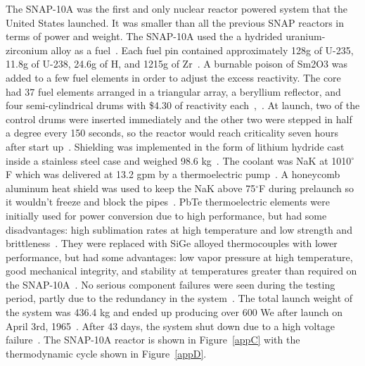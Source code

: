 \documentclass{article}
\begin{document}
The SNAP-10A was the first and only nuclear reactor powered system that the United States launched. It was smaller than all the previous SNAP reactors in terms of power and weight. The SNAP-10A used the a hydrided uranium-zirconium alloy as a fuel~\cite{lords1994snap}.  Each fuel pin contained approximately 128g of U-235, 11.8g of U-238, 24.6g of H, and 1215g of Zr~\cite{voss1984snap}. A burnable poison of Sm2O3 was added to a few fuel elements in order to adjust the excess reactivity. The core had 37 fuel elements arranged in a triangular array, a beryllium reflector, and four semi-cylindrical drums with \$4.30 of reactivity each~\cite{voss1984snap},~\cite{ohlenkamp1966snap}. At launch, two of the control drums were inserted immediately and the other two were stepped in half a degree every 150 seconds, so the reactor would reach criticality seven hours after start up~\cite{voss1984snap}. Shielding was implemented in the form of lithium hydride cast inside a stainless steel case and weighed 98.6 kg~\cite{ohlenkamp1966snap}. The coolant was NaK at 1010$^{\circ}$F which was delivered at 13.2 gpm by a thermoelectric pump~\cite{ohlenkamp1966snap}. A honeycomb aluminum heat shield was used to keep the NaK above 75$^{\circ}$F during prelaunch so it wouldn't freeze and block the pipes~\cite{ohlenkamp1966snap}. PbTe thermoelectric elements were initially used for power conversion due to high performance, but had some disadvantages: high sublimation rates at high temperature and low strength and brittleness~\cite{voss1984snap}. They were replaced with SiGe alloyed thermocouples with lower performance, but had some advantages: low vapor pressure at high temperature, good mechanical integrity, and stability at temperatures greater than required on the SNAP-10A~\cite{voss1984snap}. No serious component failures were seen during the testing period, partly due to the redundancy in the system~\cite{ohlenkamp1966snap}. The total launch weight of the system was 436.4 kg and ended up producing over 600 We after launch on April 3rd, 1965~\cite{websnap}. After 43 days, the system shut down due to a high voltage failure~\cite{websnap}. The SNAP-10A reactor is shown in Figure~\ref{appC} with the thermodynamic cycle shown in Figure~\ref{appD}. 
\end{document}
